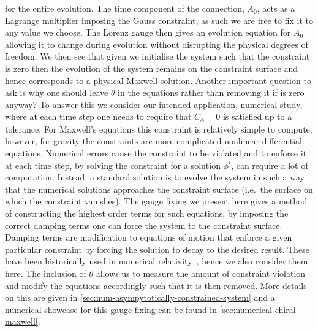 \documentclass[10pt]{report}
\theoremstyle{definition}
\begin{document}
for the entire evolution. The time component of the connection, $A_0$, acts as a Lagrange multiplier imposing the Gauss constraint, as such we are free to fix it to any value we choose. The Lorenz gauge then gives an evolution equation for $A_0$ allowing it to change during evolution without disrupting the physical degrees of freedom. We then see that given we initialise the system such that the constraint is zero then the evolution of the system remains on the constraint surface and hence corresponds to a physical Maxwell solution. Another important question to ask is why one should leave $\theta$ in the equations rather than removing it if is zero anyway? To answer this we consider our intended application, numerical study, where at each time step one needs to require that $C_\phi = 0$ is satisfied up to a tolerance. For Maxwell's equations this constraint is relatively simple to compute, however, for gravity the constraints are more complicated nonlinear differential equations. Numerical errors cause the constraint to be violated and to enforce it at each time step, by solving the constraint for a solution $\phi^i$, can require a lot of computation. Instead, a standard solution is to evolve the system in such a way that the numerical solutions approaches the constraint surface (i.e.\ the surface on which the constraint vanishes). The gauge fixing we present here gives a method of constructing the highest order terms for such equations, by imposing the correct damping terms one can force the system to the constraint surface. Damping terms are modification to equations of motion that enforce a given particular constraint by forcing the solution to decay to the desired result. These have been historically used in numerical relativity~\cite{Einstein_s_Equa_Brodbe_1998}, hence we also consider them here. The inclusion of $\theta$ allows us to measure the amount of constraint violation and modify the equations accordingly such that it is then removed. More details on this are given in \cref{sec:num-asympytotically-constrained-system} and a numerical showcase for this gauge fixing can be found in \cref{sec:numerical-chiral-maxwell}.
\end{document}
